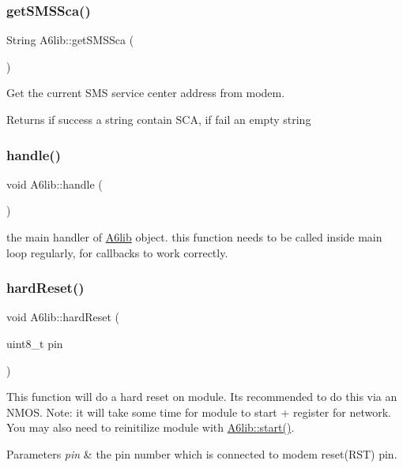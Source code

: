 \subsubsection{\texorpdfstring{get\+S\+M\+S\+Sca()}{getSMSSca()}}
{\footnotesize\ttfamily String A6lib\+::get\+S\+M\+S\+Sca (\begin{DoxyParamCaption}{ }\end{DoxyParamCaption})}

Get the current S\+MS service center address from modem. \begin{DoxyReturn}{Returns}
if success a string contain S\+CA, if fail an empty string 
\end{DoxyReturn}
\mbox{\label{class_a6lib_adcc817ae29dd20892faf53fd3a8b1bac}} 
\subsubsection{\texorpdfstring{handle()}{handle()}}
{\footnotesize\ttfamily void A6lib\+::handle (\begin{DoxyParamCaption}{ }\end{DoxyParamCaption})}

the main handler of \mbox{\hyperlink{class_a6lib}{A6lib}} object. this function needs to be called inside main loop regularly, for callbacks to work correctly. \mbox{\label{class_a6lib_a7ddb0b59879dcc59290b72a585231ef2}} 
\subsubsection{\texorpdfstring{hard\+Reset()}{hardReset()}}
{\footnotesize\ttfamily void A6lib\+::hard\+Reset (\begin{DoxyParamCaption}\item[{uint8\+\_\+t}]{pin }\end{DoxyParamCaption})}

This function will do a hard reset on module. It\textquotesingle{}s recommended to do this via an N\+M\+OS. Note\+: it will take some time for module to start + register for network. You may also need to reinitilize module with \mbox{\hyperlink{class_a6lib_a811c9dfff81c0a4fbdbc9ce824ad83d3}{A6lib\+::start()}}. 
\begin{DoxyParams}{Parameters}
{\em pin} & the pin number which is connected to modem reset(\+R\+S\+T) pin. \\
\hline
\end{DoxyParams}
\mbox{\label{class_a6lib_a9503f1167ed6fd225aee3086b827803d}} 
